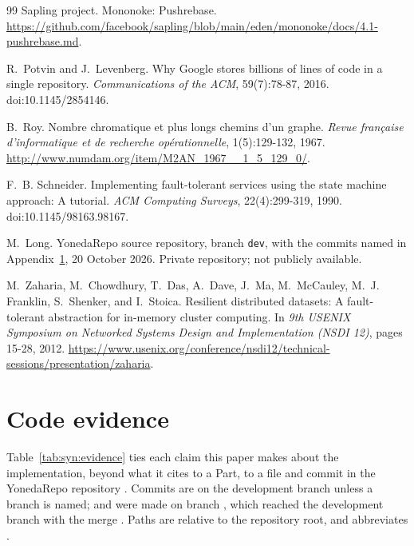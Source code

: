 \documentclass[11pt,letterpaper]{article}
\theoremstyle{definition}
\theoremstyle{remark}
\begin{document}
\begin{thebibliography}{99}
Sapling project.
Mononoke: Pushrebase.
\url{https://github.com/facebook/sapling/blob/main/eden/mononoke/docs/4.1-pushrebase.md}.

R.~Potvin and J.~Levenberg.
Why Google stores billions of lines of code in a single repository.
\emph{Communications of the ACM}, 59(7):78-87, 2016.
doi:10.1145/2854146.

B.~Roy.
Nombre chromatique et plus longs chemins d'un graphe.
\emph{Revue fran\c{c}aise d'informatique et de recherche op\'erationnelle}, 1(5):129-132, 1967.
\url{http://www.numdam.org/item/M2AN_1967__1_5_129_0/}.

F.~B. Schneider.
Implementing fault-tolerant services using the state machine approach: A tutorial.
\emph{ACM Computing Surveys}, 22(4):299-319, 1990.
doi:10.1145/98163.98167.

M.~Long.
YonedaRepo source repository, branch \texttt{dev}, with the commits named in Appendix~\ref{app:syn:evidence}, 20 October 2026.
Private repository; not publicly available.

M.~Zaharia, M.~Chowdhury, T.~Das, A.~Dave, J.~Ma, M.~McCauley, M.~J. Franklin, S.~Shenker, and I.~Stoica.
Resilient distributed datasets: A fault-tolerant abstraction for in-memory cluster computing.
In \emph{9th USENIX Symposium on Networked Systems Design and Implementation (NSDI 12)}, pages 15-28, 2012.
\url{https://www.usenix.org/conference/nsdi12/technical-sessions/presentation/zaharia}.

\end{thebibliography}

\appendix

\section{Code evidence}
\label{app:syn:evidence}

Table~\ref{tab:syn:evidence} ties each claim this paper makes about the implementation, beyond what it cites to a Part, to a file and commit in the YonedaRepo repository \cite{yonedarepo}. Commits are on the development branch unless a branch is named;  and  were made on branch , which reached the development branch with the merge . Paths are relative to the repository root, and  abbreviates .
\end{document}
